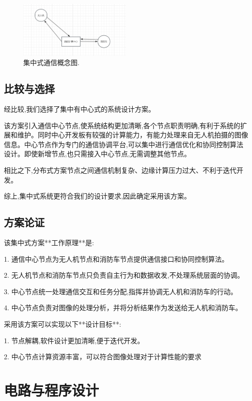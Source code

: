 \documentclass[12pt, a4paper, oneside]{article}
\begin{document}
\begin{figure}[H]
    \centering
    \includegraphics[width=0.5\textwidth]{image-7.png}
    \caption{集中式通信概念图.}
    \label{集中式通信概念图}
\end{figure}


\subsection{比较与选择}

经比较,我们选择了集中有中心式的系统设计方案。

该方案引入通信中心节点,使系统结构更加清晰,各个节点职责明确,有利于系统的扩展和维护。同时中心开发板有较强的计算能力，有能力处理来自无人机拍摄的图像信息。中心节点作为专门的通信协调平台,可以集中进行通信优化和协同控制算法设计。即使新增节点,也只需接入中心节点,无需调整其他节点。

相比之下,分布式方案节点之间通信机制复杂、边缘计算压力过大、不利于迭代开发。

综上,集中式系统更符合我们的设计要求,因此确定采用该方案。

\subsection{方案论证}

该集中式方案**工作原理**是:

1. 通信中心节点为无人机节点和消防车节点提供通信接口和协同控制算法。

2. 无人机节点和消防车节点只负责自主行为和数据收发,不处理系统层面的协调。

3. 中心节点统一处理通信交互和任务分配,指挥并协调无人机和消防车的行动。

4. 中心节点负责对图像的处理分析，并将分析结果作为发送给无人机和消防车。

采用该方案可以实现以下**设计目标**:

1. 节点解耦,软件设计更加清晰,便于迭代开发。

2. 中心节点计算资源丰富，可以符合图像处理对于计算性能的要求

\section{电路与程序设计}
\end{document}
